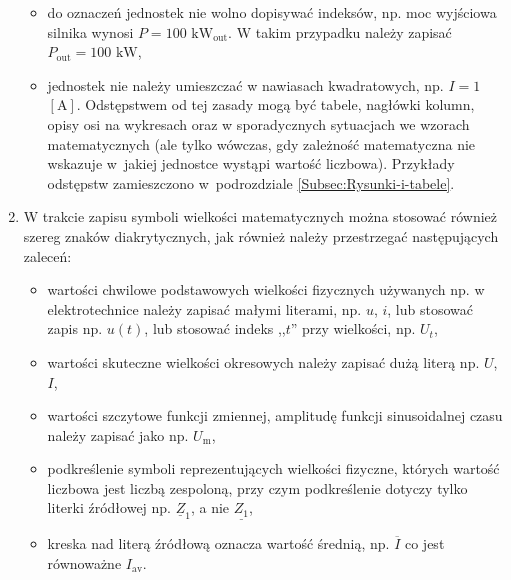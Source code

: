 \documentclass[12pt,twoside]{article}
\begin{document}
\begin{enumerate}[label=\arabic*), leftmargin=1.25cm]
\begin{itemize}[label=-,labelsep=0.4cm,leftmargin=0.6cm]
\item do oznaczeń jednostek nie wolno dopisywać indeksów, np. moc wyjściowa silnika wynosi $P=100$ $\mathrm{kW}_\mathrm{out}$. W takim przypadku należy zapisać $P_\mathrm{out}=100$ $\mathrm{kW}$,

\item jednostek nie należy umieszczać w nawiasach kwadratowych, np. $I=1$ $\mathrm{[A]}$. Odstępstwem od tej zasady mogą być tabele, nagłówki kolumn, opisy osi na wykresach oraz w sporadycznych sytuacjach we wzorach matematycznych (ale tylko wówczas, gdy zależność matematyczna nie wskazuje w~jakiej jednostce wystąpi wartość liczbowa). Przykłady odstępstw zamieszczono w~podrozdziale \ref{Subsec:Rysunki-i-tabele}.   

\end{itemize}

\item W trakcie zapisu symboli wielkości matematycznych można stosować również szereg znaków diakrytycznych, jak również należy przestrzegać następujących zaleceń:

\begin{itemize}[label=-,labelsep=0.4cm,leftmargin=0.6cm]
\item wartości chwilowe podstawowych wielkości fizycznych używanych np. w elektrotechnice należy zapisać małymi literami, np. $u$, $i$, lub stosować zapis np. $u(t)$, lub stosować indeks ,,$t$'' przy wielkości, np. $U_t$,

\item wartości skuteczne wielkości okresowych należy zapisać dużą literą np. $U$, $I$, 

\item wartości szczytowe funkcji zmiennej, amplitudę funkcji sinusoidalnej czasu należy zapisać jako np. $U_\mathrm{m}$,

\item podkreślenie symboli reprezentujących wielkości fizyczne, których wartość liczbowa jest liczbą zespoloną, przy czym podkreślenie dotyczy tylko literki źródłowej np. $\underline{Z}_1$, a nie $\underline{Z_1}$,

\item kreska nad literą źródłową oznacza wartość średnią, np. $\overline{I}$ co jest równoważne $I_\mathrm{av}$.

\end{itemize}

\end{enumerate}
\end{document}
